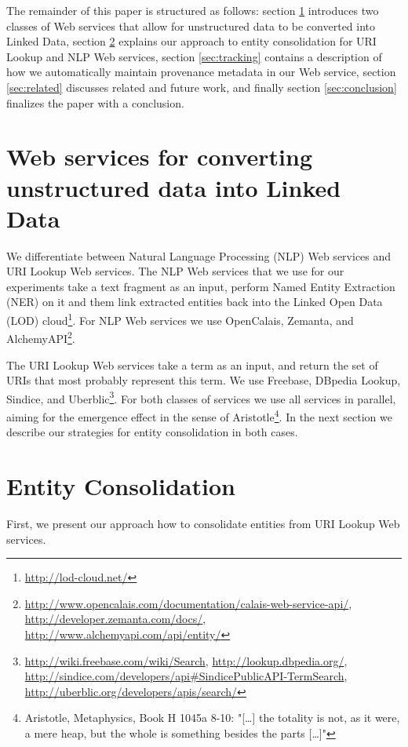 \documentclass{acm_proc_article-sp}
\begin{document}
The remainder of this paper is structured as follows: section \ref{sec:services} introduces two classes of Web services that allow for unstructured data to be converted into Linked Data, section \ref{sec:consolidation} explains our approach to entity consolidation for URI Lookup and NLP Web services, section \ref{sec:tracking} contains a description of how we automatically maintain provenance metadata in our Web service, section \ref{sec:related} discusses related and future work, and finally section \ref{sec:conclusion} finalizes the paper with a conclusion.

\section{Web services for converting unstructured data into Linked Data}\label{sec:services}
We differentiate between Natural Language Processing (NLP) Web services and URI Lookup Web services. The NLP Web services that we use for our experiments take a text fragment as an input, perform Named Entity Extraction (NER) on it and them link extracted entities back into the Linked Open Data (LOD) cloud\footnote{\url{http://lod-cloud.net/}}. For NLP Web services we use OpenCalais, Zemanta, and AlchemyAPI\footnote{\url{http://www.opencalais.com/documentation/calais-web-service-api/}, \url{http://developer.zemanta.com/docs/}, \url{http://www.alchemyapi.com/api/entity/}}.

The URI Lookup Web services take a term as an input, and return the set of URIs that most probably represent this term. We use Freebase, DBpedia Lookup, Sindice, and Uberblic\footnote{\url{http://wiki.freebase.com/wiki/Search}, \url{http://lookup.dbpedia.org/}, \url{http://sindice.com/developers/api#SindicePublicAPI-TermSearch}, \url{http://uberblic.org/developers/apis/search/}}. For both classes of services we use all services in parallel, aiming for the emergence effect in the sense of Aristotle\footnote{Aristotle, Metaphysics, Book H 1045a 8-10: "[\ldots] the totality is not, as it were, a mere heap, but the whole is something besides the parts [\ldots]"}. In the next section we describe our strategies for entity consolidation in both cases. 

\section{Entity Consolidation}\label{sec:consolidation}
First, we present our approach how to consolidate entities from URI Lookup Web services.
\end{document}

